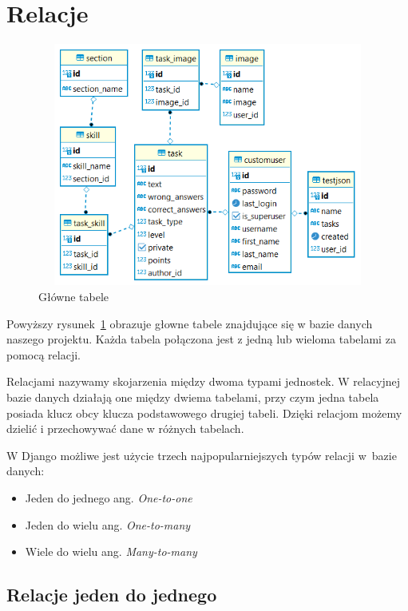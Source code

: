 \documentclass[oneside,polski,logo,indent]{amuthesis}
\begin{document}
\section{Relacje}

\begin{figure}[H]
  \centering
  \includegraphics[width=12cm, height=8cm]{gl-relacje.png}
  \caption{Główne tabele}
  \label{relacje}
\end{figure}

\noindent Powyższy rysunek~\ref{relacje} obrazuje głowne tabele znajdujące się w bazie danych naszego projektu. Każda tabela połączona jest z jedną lub wieloma tabelami za pomocą relacji.

Relacjami nazywamy skojarzenia między dwoma typami jednostek. W relacyjnej bazie danych działają one między dwiema tabelami, przy czym jedna tabela posiada klucz obcy klucza podstawowego drugiej tabeli. Dzięki relacjom możemy dzielić i przechowywać dane w różnych tabelach.

W Django możliwe jest użycie trzech najpopularniejszych typów relacji w~bazie danych:

\begin{itemize}
\item Jeden do jednego ang. \emph{One-to-one}
\item Jeden do wielu ang. \emph{One-to-many}
\item Wiele do wielu ang. \emph{Many-to-many}

\end{itemize}


\begin{center}
\subsection{Relacje jeden do jednego}
\end{center}
\end{document}
